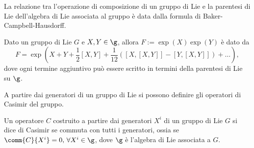 La relazione tra l'operazione di composizione di un gruppo di Lie e la parentesi di Lie dell'algebra di Lie associata al gruppo è data dalla formula di Baker-Campbell-Hausdorff.
\begin{teo}
    Dato un gruppo di Lie $G$ e $X,Y\in\g$, allora $F:=\exp(X)\exp(Y)$ è dato da
    \begin{equation}
        F= \exp\left(X + Y + \frac{1}{2}[X, Y] + \frac{1}{12}([X, [X, Y]] - [Y, [X, Y]]) + \ldots \right),
    \end{equation}
    dove ogni termine aggiuntivo può essere scritto in termini della parentesi di Lie su $\g$.
\end{teo}
A partire dai generatori di un gruppo di Lie si possono definire gli operatori di Casimir del gruppo.
\begin{defn}
    Un operatore $C$ costruito a partire dai generatori $X^i$ di un gruppo di Lie $G$ si dice di Casimir se commuta con tutti i generatori, ossia se $\comm{C}{X^i} = 0,\,\forall X^i\in\g$, dove $\g$ è l'algebra di Lie associata a $G$.
\end{defn}

